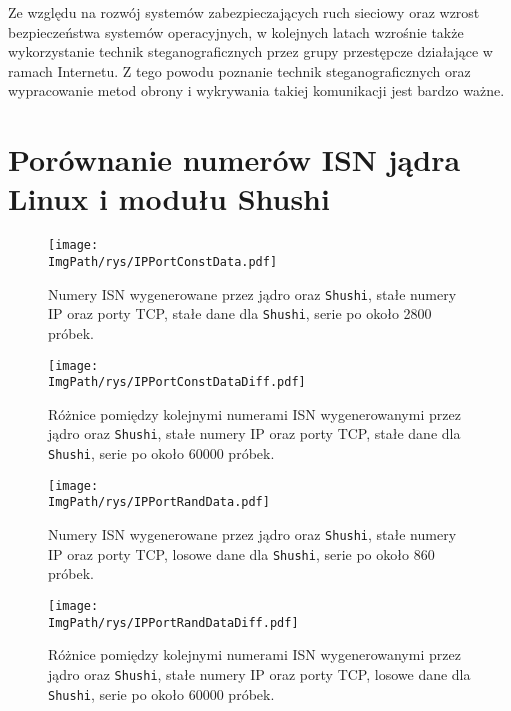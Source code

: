 \documentclass[a4paper,12pt,twoside,openany]{report}
\newcommand{\ImgPath}{.}
\newcommand{\tech}{\texttt}
\begin{document}
Ze względu na rozwój systemów zabezpieczających ruch sieciowy oraz wzrost 
bezpieczeństwa systemów operacyjnych, w kolejnych latach wzrośnie także 
wykorzystanie technik steganograficznych przez grupy przestępcze działające w 
ramach Internetu. Z tego powodu poznanie technik steganograficznych oraz 
wypracowanie metod obrony i wykrywania takiej komunikacji jest bardzo ważne.

\appendix
\chapter{Porównanie numerów ISN jądra Linux i modułu Shushi}
\begin{figure}[!htbp]
	\begin{center}
\centering
\texttt{[image: \\ImgPath/rys/IPPortConstData.pdf]}
\end{center}
	\caption{Numery ISN wygenerowane przez jądro oraz \tech{Shushi}, stałe 
numery IP oraz porty TCP, stałe dane dla \tech{Shushi}, serie po około 2800 
próbek.}
	\label{IPPortConstData}
\end{figure}

\begin{figure}[!htbp]
	\begin{center}
\centering
\texttt{[image: \\ImgPath/rys/IPPortConstDataDiff.pdf]}
\end{center}
	\caption{Różnice pomiędzy kolejnymi numerami ISN wygenerowanymi przez 
jądro oraz \tech{Shushi}, stałe numery IP oraz porty TCP, stałe dane dla 
\tech{Shushi}, serie po około 60000 próbek.}
	\label{IPPortConstDataDiff}
\end{figure}

\begin{figure}[!htbp]
	\begin{center}
\centering
\texttt{[image: \\ImgPath/rys/IPPortRandData.pdf]}
\end{center}
	\caption{Numery ISN wygenerowane przez jądro oraz \tech{Shushi}, stałe 
numery IP oraz porty TCP, losowe dane dla \tech{Shushi}, serie po około 860 
próbek.}
	\label{IPPortRandData}
\end{figure}

\begin{figure}[!htbp]
	\begin{center}
\centering
\texttt{[image: \\ImgPath/rys/IPPortRandDataDiff.pdf]}
\end{center}
	\caption{Różnice pomiędzy kolejnymi numerami ISN wygenerowanymi przez 
jądro oraz \tech{Shushi}, stałe numery IP oraz porty TCP, losowe dane dla 
\tech{Shushi}, serie po około 60000 próbek.}
	\label{IPPortRandDataDiff}
\end{figure}
\end{document}
